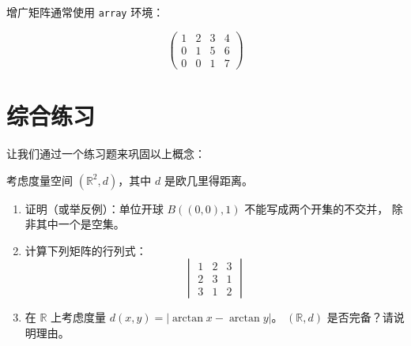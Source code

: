 增广矩阵通常使用 \lstinline|array| 环境：

\begin{equation}
    \left(\begin{array}{ccc|c}
        1 & 2 & 3 & 4 \\
        0 & 1 & 5 & 6 \\
        0 & 0 & 1 & 7
    \end{array}\right)
    \label{eq:augmented}
\end{equation}

\section{综合练习}

让我们通过一个练习题来巩固以上概念：

\begin{exercise}
考虑度量空间 $(\mathbb{R}^2, d)$，其中 $d$ 是欧几里得距离。
\begin{enumerate}[label=(\arabic*)]
    \item 证明（或举反例）：单位开球 $B((0,0), 1)$ 不能写成两个开集的不交并，
        除非其中一个是空集。
    \item 计算下列矩阵的行列式：
    \[
    \begin{vmatrix}
        1 & 2 & 3 \\
        2 & 3 & 1 \\
        3 & 1 & 2
    \end{vmatrix}
    \]
    \item 在 $\mathbb{R}$ 上考虑度量 $d(x, y) = |\arctan x - \arctan y|$。
        $(\mathbb{R}, d)$ 是否完备？请说明理由。
\end{enumerate}
\end{exercise}


